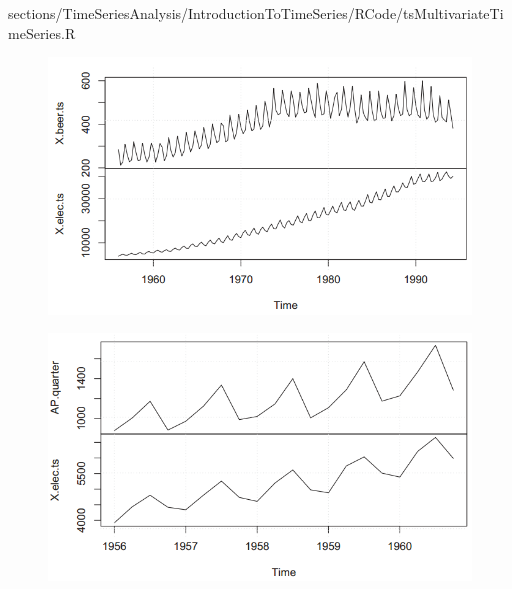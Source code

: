 {{{\begin{itemize}
\end{itemize}
}
{sections/TimeSeriesAnalysis/IntroductionToTimeSeries/RCode/tsMultivariateTimeSeries.R}
\begin{figure}[H]\centering
		\begin{minipage}[t]{.5\textwidth}
		\includegraphics[width=1\linewidth]{images/tsBeerVsElec.png}
		\label{Fig:BeerVsElectricity}
	\end{minipage}\hfill
	\begin{minipage}[t]{.5\textwidth}
		\includegraphics[width=1\linewidth]{images/tsAPVsElec.png}
		\label{Fig:APVsElectricity}
	\end{minipage}
\end{figure}

}
}

